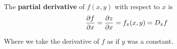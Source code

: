 \begin{definition}
    The \textbf{partial derivative} of $f(x,y)$ with respect to $x$ is
    \begin{align*}
        \frac{\partial f}{\partial x} = \frac{\partial z}{\partial x} = f_x(x,y) = D_x f
    \end{align*}

    Where we take the derivative of $f$ as if $y$ was a constant.
\end{definition}

